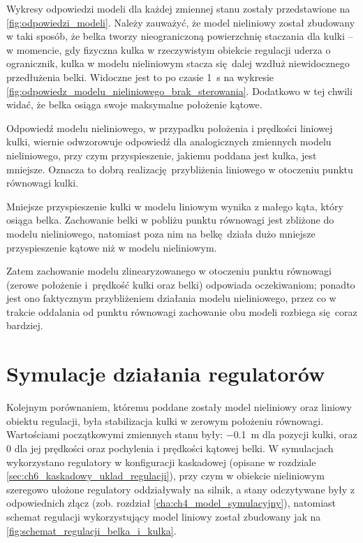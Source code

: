 Wykresy odpowiedzi modeli dla każdej zmiennej stanu zostały przedstawione na \cref{fig:odpowiedzi_modeli}. Należy zauważyć, że model nieliniowy został zbudowany w taki sposób, że belka tworzy nieograniczoną powierzchnię staczania dla kulki -- w momencie, gdy fizyczna kulka w rzeczywistym obiekcie regulacji uderza o ogranicznik, kulka w modelu nieliniowym stacza się dalej wzdłuż niewidocznego przedłużenia belki. Widoczne jest to po czasie \SI{1}{\second} na wykresie \ref{fig:odpowiedz_modelu_nieliniowego_brak_sterowania}. Dodatkowo w tej chwili widać, że belka osiąga swoje maksymalne położenie kątowe.

Odpowiedź modelu nieliniowego, w przypadku położenia i prędkości liniowej kulki, wiernie odwzorowuje odpowiedź dla analogicznych zmiennych modelu nieliniowego, przy czym przyspieszenie, jakiemu poddana jest kulka, jest mniejsze. Oznacza to dobrą realizację przybliżenia liniowego w otoczeniu punktu równowagi kulki.

Mniejsze przyspieszenie kulki w modelu liniowym wynika z małego kąta, który osiąga belka. Zachowanie belki w pobliżu punktu równowagi jest zbliżone do modelu nieliniowego, natomiast poza nim na belkę działa dużo mniejsze przyspieszenie kątowe niż w modelu nieliniowym.

Zatem zachowanie modelu zlinearyzowanego w otoczeniu punktu równowagi (zerowe położenie i~prędkość kulki oraz belki) odpowiada oczekiwaniom; ponadto jest ono faktycznym przybliżeniem działania modelu nieliniowego, przez co w trakcie oddalania od punktu równowagi zachowanie obu modeli rozbiega się coraz bardziej.

\section{Symulacje działania regulatorów}
\label{sec:ch9_symulacje_regulatorow}

Kolejnym porównaniem, któremu poddane zostały model nieliniowy oraz liniowy obiektu regulacji, była stabilizacja kulki w zerowym położeniu równowagi. Wartościami początkowymi zmiennych stanu były: \SI{-0.1}{\meter} dla pozycji kulki, oraz \num{0} dla jej prędkości oraz pochylenia i prędkości kątowej belki. W symulacjach wykorzystano regulatory w konfiguracji kaskadowej (opisane w rozdziale \ref{sec:ch6_kaskadowy_uklad_regulacji}), przy czym w obiekcie nieliniowym szeregowo ułożone regulatory oddziaływały na silnik, a stany odczytywane były z odpowiednich złącz (zob. rozdział \ref{cha:ch4_model_symulacyjny}), natomiast schemat regulacji wykorzystujący model liniowy został zbudowany jak na \cref{fig:schemat_regulacji_belka_i_kulka}.

